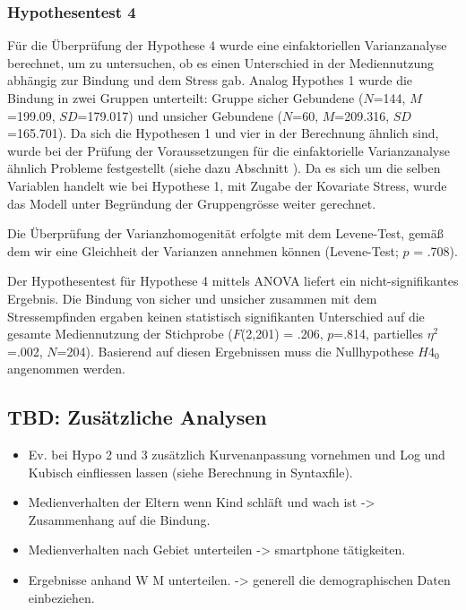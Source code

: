 \subsubsection{Hypothesentest 4}
Für die Überprüfung der Hypothese 4 wurde eine einfaktoriellen Varianzanalyse berechnet, um zu untersuchen, ob es einen Unterschied in der Mediennutzung abhängig zur Bindung und dem Stress gab. Analog Hypothes 1 wurde die Bindung in zwei Gruppen unterteilt: Gruppe sicher Gebundene ($N$=144, $M$=199.09, $SD$=179.017) und unsicher Gebundene ($N$=60, $M$=209.316, $SD$=165.701). Da sich die Hypothesen 1 und vier in der Berechnung ähnlich sind, wurde bei der Prüfung der Voraussetzungen für die einfaktorielle Varianzanalyse ähnlich Probleme festgestellt (siehe dazu Abschnitt ). Da es sich um die selben Variablen handelt wie bei Hypothese 1, mit Zugabe der Kovariate Stress, wurde das Modell unter Begründung der Gruppengrösse weiter gerechnet. 

Die Überprüfung der Varianzhomogenität erfolgte mit dem Levene-Test, gemäß dem wir eine Gleichheit der Varianzen annehmen können (Levene-Test; $p$ = .708). 

Der Hypothesentest für Hypothese 4 mittels ANOVA liefert ein nicht-signifikantes Ergebnis. Die Bindung von sicher und unsicher zusammen mit dem Stressempfinden ergaben keinen statistisch signifikanten Unterschied auf die gesamte Mediennutzung der Stichprobe ($F$(2,201) = .206, $p$=.814, partielles $\eta^2$=.002, $N$=204). Basierend auf diesen Ergebnissen muss die Nullhypothese $H4_{0}$ angenommen werden. 

\subsection{TBD: Zusätzliche Analysen} \label{sec:ZusätzlicheAnalysen}

\begin{itemize}
    \item Ev. bei Hypo 2 und 3 zusätzlich Kurvenanpassung vornehmen und Log und Kubisch einfliessen lassen (siehe Berechnung in Syntaxfile).
    \item Medienverhalten der Eltern wenn Kind schläft und wach ist -> Zusammenhang auf die Bindung.
    \item Medienverhalten nach Gebiet unterteilen -> smartphone tätigkeiten.
    \item Ergebnisse anhand W M unterteilen. -> generell die demographischen Daten einbeziehen.
\end{itemize}





